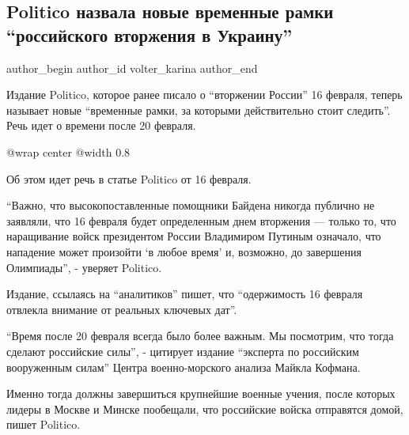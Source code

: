  
 
 
 
 
 
\subsection{Politico назвала новые временные рамки \enquote{российского вторжения в Украину}}
\label{sec:17_02_2022.stz.news.ua.strana.1.politico_vtorzhenie_ramki}
 
\ifcmt
 author_begin
   author_id volter_karina
 author_end
\fi

Издание Politico, которое ранее писало о \enquote{вторжении России} 16 февраля,
теперь называет новые \enquote{временные рамки, за которыми действительно стоит
следить}. Речь идет о времени после 20 февраля.


\ifcmt
  @wrap center
  @width 0.8
\fi

Об этом идет речь в статье Politico от 16 февраля.

\enquote{Важно, что высокопоставленные помощники Байдена никогда публично не заявляли,
что 16 февраля будет определенным днем вторжения — только то, что наращивание
войск президентом России Владимиром Путиным означало, что нападение может
произойти \enquote{в любое время} и, возможно, до завершения Олимпиады}, - уверяет
Politico.

Издание, ссылаясь на \enquote{аналитиков} пишет, что \enquote{одержимость 16 февраля отвлекла
внимание от реальных ключевых дат}.

\enquote{Время после 20 февраля всегда было более важным. Мы посмотрим, что тогда
сделают российские силы}, - цитирует издание \enquote{эксперта по российским
вооруженным силам} Центра военно-морского анализа Майкла Кофмана.

Именно тогда должны завершиться крупнейшие военные учения, после которых лидеры
в Москве и Минске пообещали, что российские войска отправятся домой, пишет
Politico.

